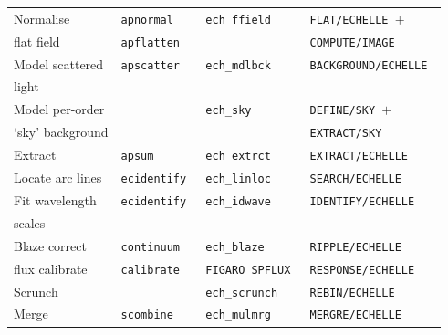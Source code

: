\documentclass[twoside,11pt]{article}
\newenvironment{latexonly}{}{}
\begin{document}
\begin{latexonly}
\begin{table}
\begin{center}
\begin{tabular}{llll}
Normalise          & {\tt apnormal        } & {\tt ech\_ffield   } & {\tt FLAT/ECHELLE $+$   } \\
flat field         & {\tt apflatten       } &                      & {\tt COMPUTE/IMAGE      } \\
Model scattered    & {\tt apscatter       } & {\tt ech\_mdlbck   } & {\tt BACKGROUND/ECHELLE } \\
light              &                        &                      &                           \\
Model per-order    &                        & {\tt ech\_sky      } & {\tt DEFINE/SKY $+$     } \\
`sky' background   &                        &                      & {\tt EXTRACT/SKY        } \\
Extract            & {\tt apsum           } & {\tt ech\_extrct   } & {\tt EXTRACT/ECHELLE    } \\
Locate arc lines   & {\tt ecidentify      } & {\tt ech\_linloc   } & {\tt SEARCH/ECHELLE     } \\
Fit wavelength     & {\tt ecidentify      } & {\tt ech\_idwave   } & {\tt IDENTIFY/ECHELLE   } \\
scales             &                        &                      &                           \\
Blaze correct      & {\tt continuum       } & {\tt ech\_blaze    } & {\tt RIPPLE/ECHELLE     } \\
flux calibrate     & {\tt calibrate       } & {\tt FIGARO SPFLUX } & {\tt RESPONSE/ECHELLE   } \\
Scrunch            &                        & {\tt ech\_scrunch  } & {\tt REBIN/ECHELLE      } \\
Merge              & {\tt scombine        } & {\tt ech\_mulmrg   } & {\tt MERGRE/ECHELLE     } \\
\hline\hline
\end{tabular}
\end{center}
\end{table}
\end{latexonly}
\end{document}
